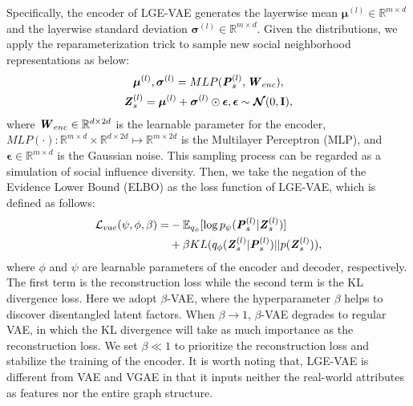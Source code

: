 \documentclass[letterpaper]{article} %
\begin{document}
Specifically, the encoder of LGE-VAE generates the layerwise mean $\boldsymbol{\mu}^{(l)} \in \mathbb{R}^{m\times d}$ and the layerwise standard deviation $\boldsymbol{\sigma}^{(l)} \in \mathbb{R}^{m\times d}$. Given the distributions, we apply the reparameterization trick to sample new social neighborhood representations as below:
\begin{gather}
    \boldsymbol{\mu}^{(l)}, \boldsymbol{\sigma}^{(l)} = MLP(\textbf{\textit{P}}_{s}^{(l)}, \textbf{\textit{W}}_{enc}),\\
    \textbf{\textit{Z}}_s^{(l)} = \boldsymbol{\mu}^{(l)}+\boldsymbol{\sigma}^{(l)}\odot\boldsymbol{\epsilon}, \boldsymbol{\epsilon} \sim \boldsymbol{\mathcal{N}}(0,\textbf{I}),
\end{gather}
where $\textbf{\textit{W}}_{enc} \in \mathbb{R}^{d\times 2d}$ is the learnable parameter for the encoder, $MLP(\cdot): \mathbb{R}^{m\times d}\times \mathbb{R}^{d\times 2d} \mapsto \mathbb{R}^{m\times 2d}$ is the Multilayer Perceptron (MLP), and $\boldsymbol{\epsilon} \in \mathbb{R}^{m\times d}$ is the Gaussian noise. This sampling process can be regarded as a simulation of social influence diversity. Then, we take the negation of the Evidence Lower Bound (ELBO) as the loss function of LGE-VAE, which is defined as follows:
\begin{equation}
    \begin{split}
        \mathcal{L}_{vae}(\psi,\phi,\beta)=
        &-\mathbb{E}_{q_\phi}[\log p_{\psi}(\textbf{\textit{P}}_s^{(l)}|\textbf{\textit{Z}}_s^{(l)})]\\
        &+\beta KL (q_{\phi}(\textbf{\textit{Z}}_s^{(l)} | \textbf{\textit{P}}_s^{(l)}) || p(\textbf{\textit{Z}}_s^{(l)})),
    \end{split}
\end{equation}
where $\phi$ and $\psi$ are learnable parameters of the encoder and decoder, respectively. The first term is the reconstruction loss while the second term is the KL divergence loss. Here we adopt $\beta$-VAE, where the hyperparameter $\beta$ helps to discover disentangled latent factors. When $\beta \rightarrow 1$, $\beta$-VAE degrades to regular VAE, in which the KL divergence will take as much importance as the reconstruction loss. We set $\beta \ll 1$ to prioritize the reconstruction loss and stabilize the training of the encoder. It is worth noting that, LGE-VAE is different from VAE and VGAE in that it inputs neither the real-world attributes as features nor the entire graph structure.
\end{document}
